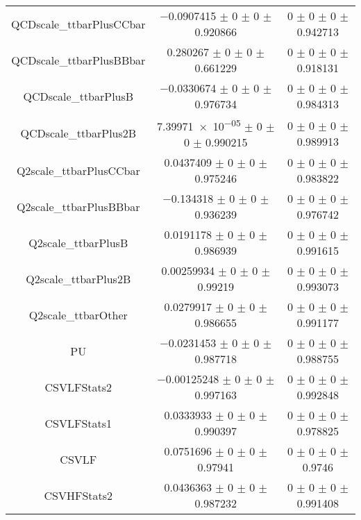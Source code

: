 \begin{table}
\begin{tabular}{ccc}
QCDscale\_ttbarPlusCCbar & \num{-0.0907415} $\pm$ \num{0} $\pm$ \num{0} $\pm$ \num{0.920866} & \num{0} $\pm$ \num{0} $\pm$ \num{0} $\pm$ \num{0.942713}\\
QCDscale\_ttbarPlusBBbar & \num{0.280267} $\pm$ \num{0} $\pm$ \num{0} $\pm$ \num{0.661229} & \num{0} $\pm$ \num{0} $\pm$ \num{0} $\pm$ \num{0.918131}\\
QCDscale\_ttbarPlusB & \num{-0.0330674} $\pm$ \num{0} $\pm$ \num{0} $\pm$ \num{0.976734} & \num{0} $\pm$ \num{0} $\pm$ \num{0} $\pm$ \num{0.984313}\\
QCDscale\_ttbarPlus2B & \num{7.39971e-05} $\pm$ \num{0} $\pm$ \num{0} $\pm$ \num{0.990215} & \num{0} $\pm$ \num{0} $\pm$ \num{0} $\pm$ \num{0.989913}\\
Q2scale\_ttbarPlusCCbar & \num{0.0437409} $\pm$ \num{0} $\pm$ \num{0} $\pm$ \num{0.975246} & \num{0} $\pm$ \num{0} $\pm$ \num{0} $\pm$ \num{0.983822}\\
Q2scale\_ttbarPlusBBbar & \num{-0.134318} $\pm$ \num{0} $\pm$ \num{0} $\pm$ \num{0.936239} & \num{0} $\pm$ \num{0} $\pm$ \num{0} $\pm$ \num{0.976742}\\
Q2scale\_ttbarPlusB & \num{0.0191178} $\pm$ \num{0} $\pm$ \num{0} $\pm$ \num{0.986939} & \num{0} $\pm$ \num{0} $\pm$ \num{0} $\pm$ \num{0.991615}\\
Q2scale\_ttbarPlus2B & \num{0.00259934} $\pm$ \num{0} $\pm$ \num{0} $\pm$ \num{0.99219} & \num{0} $\pm$ \num{0} $\pm$ \num{0} $\pm$ \num{0.993073}\\
Q2scale\_ttbarOther & \num{0.0279917} $\pm$ \num{0} $\pm$ \num{0} $\pm$ \num{0.986655} & \num{0} $\pm$ \num{0} $\pm$ \num{0} $\pm$ \num{0.991177}\\
PU & \num{-0.0231453} $\pm$ \num{0} $\pm$ \num{0} $\pm$ \num{0.987718} & \num{0} $\pm$ \num{0} $\pm$ \num{0} $\pm$ \num{0.988755}\\
CSVLFStats2 & \num{-0.00125248} $\pm$ \num{0} $\pm$ \num{0} $\pm$ \num{0.997163} & \num{0} $\pm$ \num{0} $\pm$ \num{0} $\pm$ \num{0.992848}\\
CSVLFStats1 & \num{0.0333933} $\pm$ \num{0} $\pm$ \num{0} $\pm$ \num{0.990397} & \num{0} $\pm$ \num{0} $\pm$ \num{0} $\pm$ \num{0.978825}\\
CSVLF & \num{0.0751696} $\pm$ \num{0} $\pm$ \num{0} $\pm$ \num{0.97941} & \num{0} $\pm$ \num{0} $\pm$ \num{0} $\pm$ \num{0.9746}\\
CSVHFStats2 & \num{0.0436363} $\pm$ \num{0} $\pm$ \num{0} $\pm$ \num{0.987232} & \num{0} $\pm$ \num{0} $\pm$ \num{0} $\pm$ \num{0.991408}\\

\end{tabular}
\end{table}
